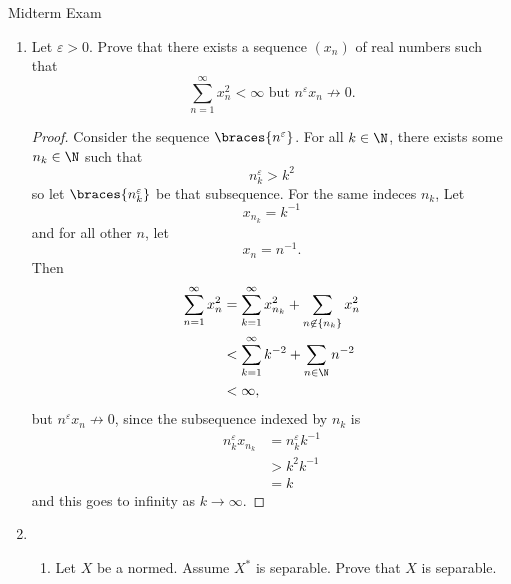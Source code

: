 \documentclass[12pt,letterpaper]{article}
\renewcommand{\epsilon}{\varepsilon}
\begin{document}
\pagestyle{fancy}
\begin{center}
{\Large Midterm Exam}%
\end{center}

\renewcommand{\B}{\bar{B}(\ell^\infty)}

\begin{enumerate}

\item Let $\epsilon>0$. Prove that there exists a sequence $(x_n)$ of real numbers such that 
$$\sum_{n=1}^\infty x_n^2 < \infty \text{ but } n^\epsilon x_n \not \to 0.$$

\begin{proof}
Consider the sequence $\braces{n^\epsilon}$. For all $k\in\N$, there exists some $n_k\in\N$ such that 
$$n_k^\epsilon>k^2$$
so let $\braces{n_k^\epsilon}$ be that subsequence. For the same indeces $n_k$, Let 
$$x_{n_k}=k^{-1}$$
and for all other $n$, let 
$$x_n=n^{-1}.$$
Then 
\begin{align*}
\sum_{n=1}^\infty x_n^2 &= \sum_{k=1}^\infty x_{n_k}^2 + \sum_{n\not\in\{n_k\}} x_n^2 \\
&<\sum_{k=1}^\infty k^{-2} + \sum_{n\in\N} n^{-2} \\
&<\infty,
\end{align*}
but $n^\epsilon x_n \not\to0$, since the subsequence indexed by $n_k$ is 
\begin{align*}
n_k^\epsilon x_{n_k} &= n_k^\epsilon k^{-1}\\
&> k^2 k^{-1} \\
&=k
\end{align*}
and this goes to infinity as $k\to\infty$. 
\end{proof}

\pagebreak
\item 
	\begin{enumerate}
	\item Let $X$ be a normed. Assume $X^*$ is separable. Prove that $X$ is separable. 
	

\end{enumerate}
\end{enumerate}
\end{document}
